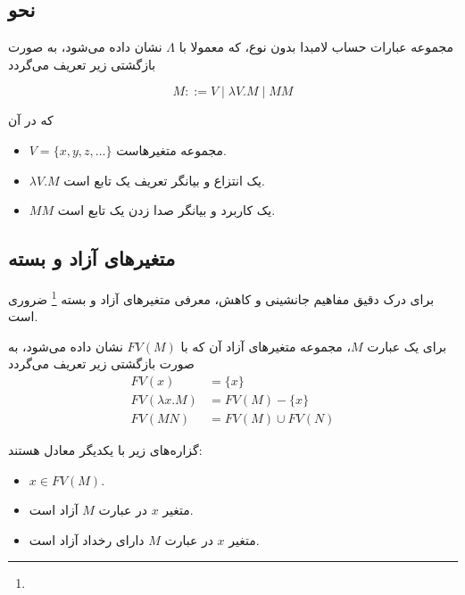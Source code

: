 \subsection*{نحو}

\begin{defn}    
مجموعه عبارات حساب لامبدا بدون نوع، که معمولا با
$\Lambda$
نشان داده می‌شود، به صورت بازگشتی زیر تعریف می‌گردد

\begin{equation*}
M ::= V \mid \lambda V.M \mid MM
\end{equation*}

که در آن

\begin{itemize}
\item $V=\{x,y,z,\dots\}$ مجموعه متغیرهاست.
\item $\lambda V.M$ یک انتزاع و بیانگر تعریف یک تابع است.
\item $MM$ یک کاربرد و بیانگر صدا زدن یک تابع است.
\end{itemize}
\end{defn}

\subsection*{متغیرهای آزاد و بسته}

برای درک دقیق مفاهیم جانشینی و کاهش، معرفی متغیرهای آزاد و بسته
\footnote{}
ضروری است.

\begin{defn}
برای یک عبارت
$M$،
مجموعه متغیرهای آزاد آن که با
$FV(M)$
نشان داده می‌شود، به صورت بازگشتی زیر تعریف می‌گردد
\begin{align*}
FV(x)&=\{x\}\\
FV(\lambda x.M)&=FV(M)-\{x\}\\
FV(MN)&=FV(M) \cup FV(N)
\end{align*}
\end{defn}

\begin{prop}
گزاره‌های زیر با یکدیگر معادل هستند:
\begin{itemize}
\item $x \in FV(M)$.
\item متغیر $x$ در عبارت $M$ آزاد است.
\item متغیر $x$ در عبارت $M$ دارای رخداد آزاد است.
\end{itemize}
\end{prop}

